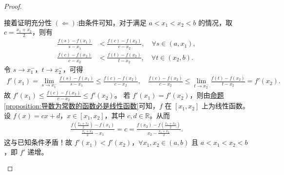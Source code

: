 \documentclass[../../main.tex]{subfiles}%
\begin{document}
\begin{proof}
\begin{enumerate}[(1)]
接着证明充分性 $(\Leftarrow)$:由条件可知，对于满足 \(a < x_1 < x_2 < b\) 的情况，取 \(c = \frac{x_1 + x_2}{2}\)，则有
\begin{align*}
\frac{f(s) - f(x_1)}{s - x_1} &< \frac{f(c) - f(x_2)}{c - x_2}, \quad \forall s \in (a, x_1), \\
\frac{f(c) - f(x_2)}{c - x_2} &< \frac{f(t) - f(x_2)}{t - x_2}, \quad \forall t \in (x_2, b).
\end{align*}
令 \(s \to x_1^-\)，\(t \to x_2^-\)，可得
\begin{align*}
f'(x_1) = \lim_{s \to x_1^-} \frac{f(s) - f(x_1)}{s - x_1} \leqslant \frac{f(c) - f(x_2)}{c - x_2}, \quad
\frac{f(c) - f(x_2)}{c - x_2} \leqslant \lim_{t \to x_2^-} \frac{f(t) - f(x_2)}{t - x_2} = f'(x_2).
\end{align*}
故 \(f'(x_1) \leqslant \frac{f(c) - f(x_2)}{c - x_2} \leqslant f'(x_2)\)。
若 \(f'(x_1) = f'(x_2)\)，则由\hyperref[proposition:导数为常数的函数必是线性函数]{命题\ref{proposition:导数为常数的函数必是线性函数}}可知，\(f\) 在 \([x_1, x_2]\) 上为线性函数。设 \(f(x) = cx + d\)，\(x \in [x_1, x_2]\)，其中 \(c, d \in \mathbb{R}\)。从而
\begin{align*}
\frac{f\left(\frac{x_1 + x_2}{2}\right) - f(x_1)}{\frac{x_1 + x_2}{2} - x_1} = c = \frac{f(x_2) - f\left(\frac{x_1 + x_2}{2}\right)}{x_2 - \frac{x_1 + x_2}{2}}.
\end{align*}
这与已知条件矛盾！故 \(f'(x_1) < f'(x_2)\)，\(\forall x_1, x_2 \in (a, b)\) 且 \(a < x_1 < x_2 < b\)，即 \(f'\) 递增。   
\end{enumerate}
\end{proof}
\end{document}
